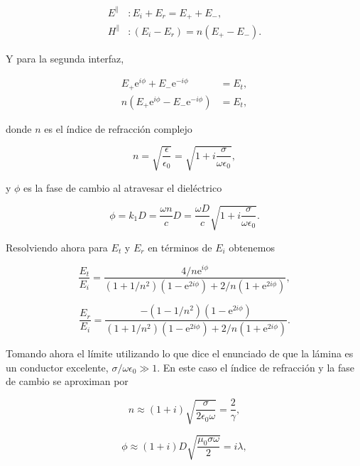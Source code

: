 \documentclass[a4paper,11pt]{article}
\numberwithin{equation}{section}
\newcommand{\euler}{\mathrm{e}}
\begin{document}
\begin{align}
 E^\parallel &: E_i + E_r = E_+ + E_-, \\
 H^\parallel &: (E_i - E_r) = n(E_+ - E_-).
\end{align}

Y para la segunda interfaz, 

\begin{align}
 E_+ \euler^{i\phi} + E_- \euler^{-i\phi} &= E_t, \\
 n (E_+ \euler^{i\phi} - E_- \euler^{-i\phi}) &= E_t,
\end{align}

donde $n$ es el índice de refracción complejo 

\begin{equation}
 n = \sqrt{\frac{\epsilon}{\epsilon_0}} = \sqrt{1 + i \frac{\sigma}{\omega\epsilon_0}},
\end{equation}

y $\phi$ es la fase  de cambio al atravesar el dieléctrico 

\begin{equation}
 \phi = k_1 D = \frac{\omega n}{c} D = \frac{\omega D}{c}\sqrt{1 + i 
 \frac{\sigma}{\omega\epsilon_0}}.
\end{equation}

Resolviendo ahora para $E_t$ y $E_r$ en términos de $E_i$ obtenemos 

\begin{equation}
 \frac{E_t}{E_i} = \frac{4/n \euler^{i\phi}}{(1 + 1/n^2)(1 - \euler^{2i\phi}) 
 + 2/n (1 + \euler^{2i\phi})},
\end{equation}

\begin{equation}
  \frac{E_r}{E_i} = \frac{-(1 - 1/n^2)(1- \euler^{2i\phi})}{(1 + 1/n^2)(1 - \euler^{2i\phi}) 
 + 2/n (1 + \euler^{2i\phi})}.
\end{equation}

Tomando ahora el límite utilizando lo que dice el enunciado de que la lámina es 
un conductor excelente, $\sigma/\omega \epsilon_0 \gg 1$. En este caso el índice 
de refracción y la fase de cambio se aproximan por 

\begin{equation}
 n \approx (1 + i) \sqrt{\frac{\sigma}{2\epsilon_0 \omega}} = \frac{2}{\gamma},
\end{equation}

\begin{equation}
 \phi \approx (1 + i) D \sqrt{\frac{\mu_0 \sigma \omega}{2}} = i \lambda,
\end{equation}
\end{document}
